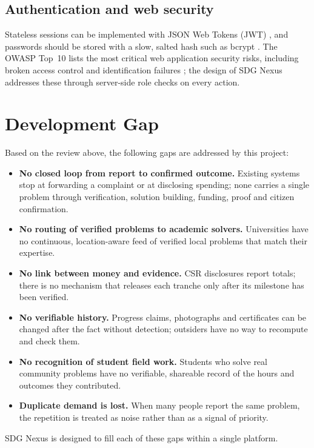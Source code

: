 \subsection*{Authentication and web security}
Stateless sessions can be implemented with JSON Web Tokens (JWT) \cite{rfc7519}, and passwords should be stored with a slow, salted hash such as bcrypt \cite{provos1999}. The OWASP Top~10 lists the most critical web application security risks, including broken access control and identification failures \cite{owasp2021}; the design of SDG Nexus addresses these through server-side role checks on every action.

\section{Development Gap}
Based on the review above, the following gaps are addressed by this project:
\begin{itemize}
  \item \textbf{No closed loop from report to confirmed outcome.} Existing systems stop at forwarding a complaint or at disclosing spending; none carries a single problem through verification, solution building, funding, proof and citizen confirmation.
  \item \textbf{No routing of verified problems to academic solvers.} Universities have no continuous, location-aware feed of verified local problems that match their expertise.
  \item \textbf{No link between money and evidence.} CSR disclosures report totals; there is no mechanism that releases each tranche only after its milestone has been verified.
  \item \textbf{No verifiable history.} Progress claims, photographs and certificates can be changed after the fact without detection; outsiders have no way to recompute and check them.
  \item \textbf{No recognition of student field work.} Students who solve real community problems have no verifiable, shareable record of the hours and outcomes they contributed.
  \item \textbf{Duplicate demand is lost.} When many people report the same problem, the repetition is treated as noise rather than as a signal of priority.
\end{itemize}
SDG Nexus is designed to fill each of these gaps within a single platform.
